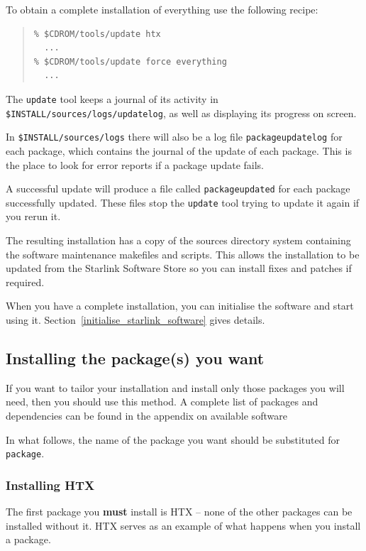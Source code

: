 \documentclass[twoside,11pt]{article}
\newcommand{\htmlref}[2]{#1}
\renewcommand{\_}{\texttt{\symbol{95}}}
\begin{document}
To obtain a complete installation of everything use the following
recipe:

\begin{quote}
\begin{verbatim}
% $CDROM/tools/update htx
  ...
% $CDROM/tools/update force everything
  ...
\end{verbatim}
\end{quote}

The \texttt{update} tool keeps a journal of its activity in 
\texttt{\$INSTALL/sources/logs/update\_log}, as well as 
displaying its progress on screen.  

In \texttt{\$INSTALL/sources/logs} there will also be a log file
\texttt{package\_update\_log} for each package, which contains the
journal of the update of each package.  This is the place to look for
error reports if a package update fails.

A successful update will produce a file called \texttt{package\_updated}
for each package successfully updated.  These files stop the
\texttt{update} tool trying to update it again if you rerun it.

The resulting installation has a copy of the sources directory system
containing the software maintenance makefiles and scripts.  This allows
the installation to be updated from the Starlink Software Store so you can
install fixes and patches if required.  

When you have a complete installation, you can initialise the software
and start using it.  Section~\ref{initialise_starlink_software} gives details.

\subsection{Installing the package(s) you want}

If you want to tailor your installation and install only those packages
you will need, then you should use this method.  A complete list of
packages and dependencies can be found in the appendix on
\htmlref{available software}{available_software}

In what follows, the name of the package you want should be substituted
for \texttt{package}.

\subsubsection{Installing HTX}

The first package you \textbf{must} install is HTX -- none of the other
packages can be installed without it.  HTX serves as an example of what
happens when you install a package.
\end{document}
